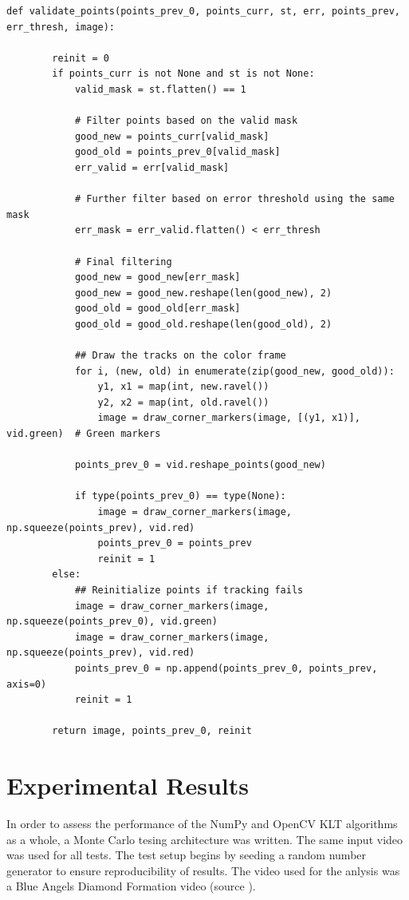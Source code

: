 \documentclass[11pt, conference, letterpaper]{IEEEtran}
\begin{document}
\begin{lstlisting}[style=python, caption={\texttt{validate\_points}}, label={lst:valpoints}]
    def validate_points(points_prev_0, points_curr, st, err, points_prev, err_thresh, image):
        
        reinit = 0
        if points_curr is not None and st is not None:                
            valid_mask = st.flatten() == 1
            
            # Filter points based on the valid mask
            good_new = points_curr[valid_mask]
            good_old = points_prev_0[valid_mask]
            err_valid = err[valid_mask]

            # Further filter based on error threshold using the same mask
            err_mask = err_valid.flatten() < err_thresh

            # Final filtering
            good_new = good_new[err_mask]
            good_new = good_new.reshape(len(good_new), 2)
            good_old = good_old[err_mask]
            good_old = good_old.reshape(len(good_old), 2)
            
            ## Draw the tracks on the color frame
            for i, (new, old) in enumerate(zip(good_new, good_old)):
                y1, x1 = map(int, new.ravel())
                y2, x2 = map(int, old.ravel())
                image = draw_corner_markers(image, [(y1, x1)], vid.green)  # Green markers

            points_prev_0 = vid.reshape_points(good_new)
            
            if type(points_prev_0) == type(None):
                image = draw_corner_markers(image, np.squeeze(points_prev), vid.red)
                points_prev_0 = points_prev
                reinit = 1
        else:
            ## Reinitialize points if tracking fails
            image = draw_corner_markers(image, np.squeeze(points_prev_0), vid.green)
            image = draw_corner_markers(image, np.squeeze(points_prev), vid.red)
            points_prev_0 = np.append(points_prev_0, points_prev, axis=0)
            reinit = 1

        return image, points_prev_0, reinit
\end{lstlisting}
\twocolumn

\section{Experimental Results}
In order to assess the performance of the NumPy and OpenCV KLT algorithms as a whole, a Monte Carlo tesing architecture was written. The same input video was used for all tests. The test setup begins by seeding a random number generator to ensure reproducibility of results. The video used for the anlysis was a Blue Angels Diamond Formation video (source \cite{Pexels:FighterJets}).
\end{document}
